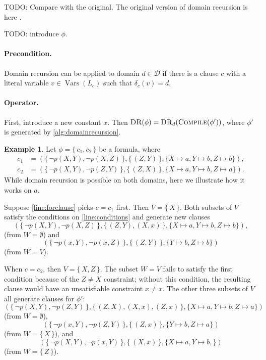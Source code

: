 \documentclass{article}
\theoremstyle{definition}
\newtheorem{example}{Example}
\DeclareMathOperator{\Compile}{\textsc{Compile}}
\DeclareMathOperator{\DR}{\textsc{DR}}
\DeclareMathOperator{\Vars}{Vars}
\begin{document}
TODO: Compare with the original. The original version of domain recursion is here \cite{DBLP:conf/nips/Broeck11}.

TODO: introduce $\phi$.

\paragraph{Precondition.} Domain recursion can be applied to domain $d \in \mathscr{D}$ if there is a clause $c$ with a literal variable $v \in \Vars(L_c)$ such that $\delta_c(v) = d$.

\paragraph{Operator.} First, introduce a new constant $x$. Then $\DR(\phi) = \DR_d(\Compile(\phi'))$, where $\phi'$ is generated by \cref{alg:domainrecursion}.

\begin{example}
  Let $\phi = \{\, c_1, c_2 \,\}$ be a formula, where
  \begin{align*}
    c_1 &= (\{\, \neg p(X, Y), \neg p(X, Z) \,\}, \{\, (Z, Y) \,\}, \{ X \mapsto a, Y \mapsto b, Z \mapsto b \}), \\
    c_2 &= (\{\, \neg p(X, Y), \neg p(Z, Y) \,\}, \{\, (Z, X) \,\}, \{ X \mapsto a, Y \mapsto b, Z \mapsto a \}).
  \end{align*}
  While domain recursion is possible on both domains, here we illustrate how it works on $a$.

  Suppose \cref{line:forclause} picks $c = c_1$ first. Then $V = \{\, X \,\}$. Both subsets of $V$ satisfy the conditions on \cref{line:conditions} and generate new clauses
  \[
  (\{\, \neg p(X, Y), \neg p(X, Z) \,\}, \{\, (Z, Y), (X, x) \,\}, \{ X \mapsto a, Y \mapsto b, Z \mapsto b \}),
  \]
  (from $W = \emptyset$) and
  \[
  (\{\, \neg p(x, Y), \neg p(x, Z) \,\}, \{\, (Z, Y) \,\}, \{ Y \mapsto b, Z \mapsto b \})
  \]
  (from $W = V$).

  When $c = c_2$, then $V = \{\, X, Z \,\}$. The subset $W = V$ fails to satisfy the first condition because of the $Z \ne X$ constraint; without this condition, the resulting clause would have an unsatisfiable constraint $x \ne x$. The other three subsets of $V$ all generate clauses for $\phi'$:
  \[
  (\{\, \neg p(X, Y), \neg p(Z, Y) \,\}, \{\, (Z, X), (X, x), (Z, x) \,\}, \{ X \mapsto a, Y \mapsto b, Z \mapsto a \})
  \]
  (from $W = \emptyset$),
  \[
  (\{\, \neg p(x, Y), \neg p(Z, Y) \,\}, \{\, (Z, x) \,\}, \{ Y \mapsto b, Z \mapsto a \})
  \]
  (from $W = \{\, X \,\}$), and
  \[
  (\{\, \neg p(X, Y), \neg p(x, Y) \,\}, \{\, (X, x) \,\}, \{ X \mapsto a, Y \mapsto b, \})
  \]
  (from $W = \{\, Z \,\}$).
\end{example}
\end{document}
